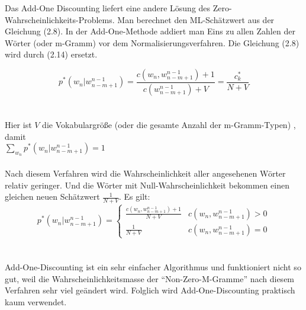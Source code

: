 Das Add-One Discounting liefert eine andere L\"osung des Zero-Wahrscheinlichkeits-Problems. Man berechnet den ML-Sch\"atzwert aus der Gleichung (2.8). In der Add-One-Methode addiert man Eins zu allen Zahlen der W\"orter (oder m-Gramm) vor dem Normalisierungsverfahren.  Die Gleichung (2.8) wird durch (2.14) ersetzt.

\begin{equation}
\label{equation:add_one_01}
p^{*}(w_{n}|w_{n-m+1}^{n-1})=\frac{c(w_{n},w_{n-m+1}^{n-1})+1}{c(w_{n-m+1}^{n-1})+V}=\frac{c_{k}^{*}}{N+V}
\end{equation}
\\
\\
Hier ist $V$ die Vokabulargr\"o\ss e (oder die gesamte Anzahl der m-Gramm-Typen) , damit \\ 
$\sum_{w_{n}}p^{*}(w_{n}|w_{n-m+1}^{n-1})=1$
\\
\\
Nach diesem Verfahren wird die Wahrscheinlichkeit aller angesehenen W\"orter relativ geringer. Und die W\"orter mit Null-Wahrscheinlichkeit bekommen einen gleichen neuen Sch\"atzwert $\frac{1}{N+V}$. Es gilt:
\begin{equation}
p^{*}(w_{n}|w_{n-m+1}^{n-1})=\begin{cases}
\frac{c(w_{n},w_{n-m+1}^{n-1})+1}{N+V} & c(w_{n},w_{n-m+1}^{n-1})>0 \\
\frac{1}{N+V} & c(w_{n},w_{n-m+1}^{n-1})=0 
\end{cases}
\end{equation}
\\
\\
Add-One-Discounting ist ein sehr einfacher Algorithmus und funktioniert nicht so gut, weil die Wahrscheinlichkeitsmasse der "`Non-Zero-M-Gramme"' nach diesem Verfahren sehr viel ge\"andert wird\cite{book_speech}. Folglich wird Add-One-Discounting  praktisch kaum verwendet.